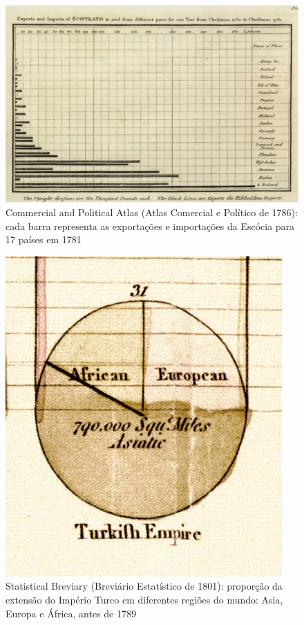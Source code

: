 \documentclass[
]{book}
\begin{document}
\begin{figure}

{\centering \includegraphics[width=0.75\linewidth]{images1/playfair-barchart-1786} 

}

\caption{Commercial and Political Atlas (Atlas Comercial e Político de 1786): cada barra representa as exportações e importações da Escócia para 17 países em 1781}\label{fig:unnamed-chunk-12}
\end{figure}

\hfill\break

\begin{figure}

{\centering \includegraphics[width=0.75\linewidth]{images1/playfair-piechart-1801} 

}

\caption{Statistical Breviary (Breviário Estatístico de 1801): proporção da extensão do Império Turco em diferentes regiões do mundo: Asia, Europa e África, antes de 1789}\label{fig:unnamed-chunk-13}
\end{figure}
\end{document}
